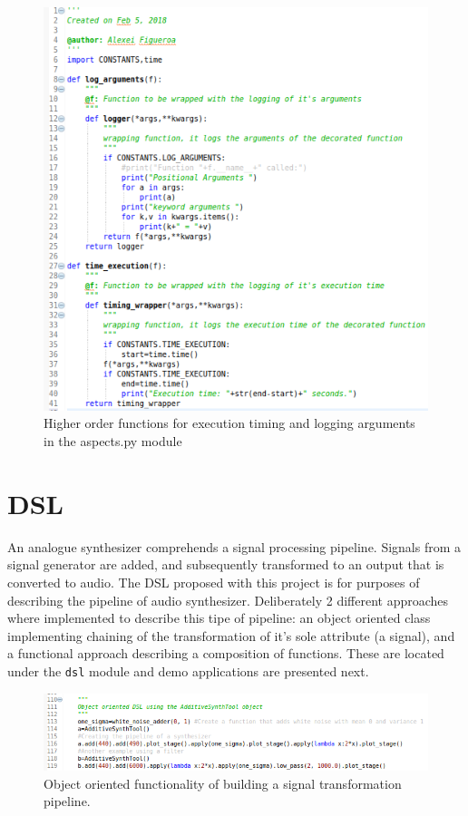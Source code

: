 \documentclass[margin,line,a4paper,authoryear,12pt]{report}
\begin{document}
\begin{figure}[h!]
    \centering
    \includegraphics[width=0.8\linewidth]{AOP_wrappers.png}
    \caption{ Higher order functions for execution timing and logging arguments in the aspects.py module}
    \label{fig:aspects}
\end{figure}


\chapter{DSL}

An analogue synthesizer comprehends a signal processing pipeline. Signals from a signal generator are added, and subsequently transformed 
to an output that is converted to audio. The DSL proposed with this project is for purposes of describing the pipeline of 
audio synthesizer. Deliberately 2 different approaches where implemented to describe this tipe of pipeline: an object oriented class implementing
chaining of the transformation of it's sole attribute (a signal), and a functional approach describing a composition of functions. These
are located under the \texttt{dsl} module and demo applications are presented next.
\begin{figure}[h!]
    \centering
    \includegraphics[width=\linewidth]{dsl_oop_example.png}
    \caption{ Object oriented functionality of building a signal transformation pipeline.}
    \label{fig:dsl_oop}
\end{figure}
\end{document}
